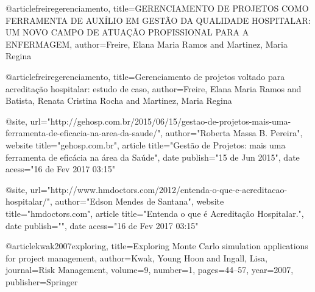 @article{freiregerenciamento,
  title={GERENCIAMENTO DE PROJETOS COMO FERRAMENTA DE AUX{\'I}LIO EM GEST{\~A}O DA QUALIDADE HOSPITALAR: UM NOVO CAMPO DE ATUA{\c{C}}{\~A}O PROFISSIONAL PARA A ENFERMAGEM},
  author={Freire, Elana Maria Ramos and Martinez, Maria Regina}
}

@article{freiregerenciamento,
  title={Gerenciamento de projetos voltado para acredita{\c{c}}{\~a}o hospitalar: estudo de caso},
  author={Freire, Elana Maria Ramos and Batista, Renata Cristina Rocha and Martinez, Maria Regina}
}

@{site,
    url={"http://gehosp.com.br/2015/06/15/gestao-de-projetos-mais-uma-ferramenta-de-eficacia-na-area-da-saude/"},
    author={"Roberta Massa B. Pereira"},
    website title={"gehosp.com.br"},
    article title={"Gestão de Projetos: mais uma ferramenta de eficácia na área da Saúde"},
    date publish={"15 de Jun 2015"},
    date acess={"16 de Fev 2017 03:15"}
}

@{site,
    url={"http://www.hmdoctors.com/2012/entenda-o-que-e-acreditacao-hospitalar/"},
    author={"Edson Mendes de Santana"},
    website title={"hmdoctors.com"},
    article title={"Entenda o que é Acreditação Hospitalar."},
    date publish={""},
    date acess={"16 de Fev 2017 03:15"}
}

@article{kwak2007exploring,
  title={Exploring Monte Carlo simulation applications for project management},
  author={Kwak, Young Hoon and Ingall, Lisa},
  journal={Risk Management},
  volume={9},
  number={1},
  pages={44--57},
  year={2007},
  publisher={Springer}
}